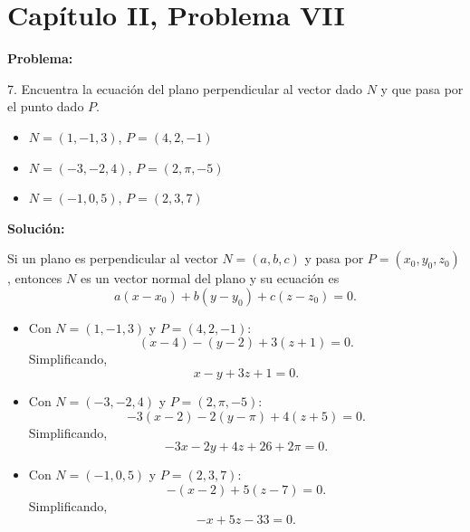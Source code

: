 \section*{Capítulo II, Problema VII}

\textbf{Problema:}

7. Encuentra la ecuación del plano perpendicular al vector dado $N$ y que pasa por el punto dado $P$.

\begin{itemize}
    \item[(a)] $N = (1, -1, 3)$, $P = (4, 2, -1)$
    \item[(b)] $N = (-3, -2, 4)$, $P = (2, \pi, -5)$
    \item[(c)] $N = (-1, 0, 5)$, $P = (2, 3, 7)$
\end{itemize}

\textbf{Solución:}

Si un plano es perpendicular al vector $N = (a,b,c)$ y pasa por $P = (x_0,y_0,z_0)$, entonces $N$ es un vector normal del plano y su ecuación es
\[
    a(x-x_0) + b(y-y_0) + c(z-z_0) = 0.
\]

\begin{itemize}
    \item[(a)] Con $N = (1,-1,3)$ y $P = (4,2,-1)$:
    \[
        (x-4) - (y-2) + 3(z+1) = 0.
    \]
    Simplificando,
    \[
        x - y + 3z + 1 = 0.
    \]

    \item[(b)] Con $N = (-3,-2,4)$ y $P = (2,\pi,-5)$:
    \[
        -3(x-2) - 2(y-\pi) + 4(z+5) = 0.
    \]
    Simplificando,
    \[
        -3x - 2y + 4z + 26 + 2\pi = 0.
    \]

    \item[(c)] Con $N = (-1,0,5)$ y $P = (2,3,7)$:
    \[
        -(x-2) + 5(z-7) = 0.
    \]
    Simplificando,
    \[
        -x + 5z - 33 = 0.
    \]
\end{itemize}